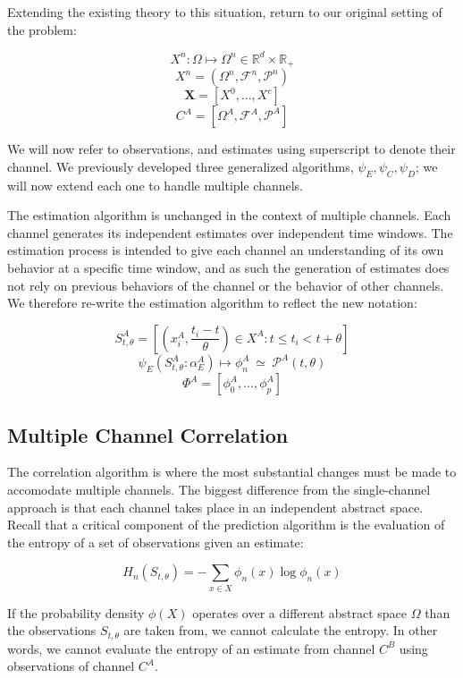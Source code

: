 \documentclass[10pt]{article}
\begin{document}
Extending the existing theory to this situation, return to our original setting of the problem:

\[ X^n : \Omega \mapsto \Omega^n \in \mathbb{R}^d \times \mathbb{R}_+ \]
\[ X^n = (\Omega^n,\mathcal{F}^n,\mathcal{P}^n) \]
\[ \mathbf{X} = [X^0,...,X^c]   \]
\[ C^A = [\Omega^A,\mathcal{F}^A,\mathcal{P}^A] \]


We will now refer to observations, and estimates using superscript to denote their channel.  We previously developed three generalized algorithms, \(\psi_E, \psi_C, \psi_D \); we will now extend each one to handle multiple channels.

The estimation algorithm is unchanged in the context of multiple channels.  Each channel generates its independent estimates over independent time windows.  The estimation process is intended to give each channel an understanding of its own behavior at a specific time window, and as such the generation of estimates does not rely on previous behaviors of the channel or the behavior of other channels.  We therefore re-write the estimation algorithm to reflect the new notation:

\begin{equation} S_{t,\theta}^A = \left[ (x_i^A,\frac{t_i - t}{\theta}) \in X^A : t \le t_i < t+\theta \right] \end{equation}
\[ \psi_E( S_{t,\theta}^A:\alpha_E^A ) \mapsto \phi_n^A \ \simeq \ \mathcal{P}^A(t,\theta)  \]
\[ \Phi^A = [\phi_0^A,...,\phi_p^A ] \nonumber \]

\subsection{Multiple Channel Correlation}
The correlation algorithm is where the most substantial changes must be made to accomodate multiple channels.  The biggest difference from the single-channel approach is that each channel takes place in an independent abstract space.  Recall that a critical component of the prediction algorithm is the evaluation of the entropy of a set of observations given an estimate:

\[ H_n(S_{t,\theta}) = -\sum_{x \in X} \phi_n(x) \log \phi_n(x) \]

If the probability density \(\phi(X) \) operates over a different abstract space \(\Omega \) than the observations \(S_{t,\theta} \) are taken from, we cannot calculate the entropy.  In other words, we cannot evaluate the entropy of an estimate from channel \(C^B \) using observations of channel \(C^A \).  
\end{document}
